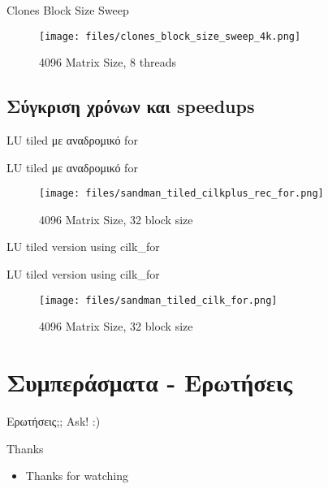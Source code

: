 \documentclass{beamer}
\begin{document}
    \begin{frame}
        \begin{block}{Clones Block Size Sweep}
            \begin{figure}[H]
                \centering
                \texttt{[image: files/clones\_block\_size\_sweep\_4k.png]}
                \caption{4096 Matrix Size, 8 threads}
            \end{figure}
        \end{block}
    \end{frame}

\subsection{Σύγκριση χρόνων και speedups}
\begin{frame}{LU tiled με αναδρομικό for}
    \begin{block}{LU tiled με αναδρομικό for}
        \begin{figure}[H]
            \centering
            \texttt{[image: files/sandman\_tiled\_cilkplus\_rec\_for.png]}
            \caption{4096 Matrix Size, 32 block size}
        \end{figure}
    \end{block}
\end{frame}


\begin{frame}{LU tiled version using cilk\_for}
    \begin{block}{LU tiled version using cilk\_for}
        \begin{figure}[H]
            \centering
            \texttt{[image: files/sandman\_tiled\_cilk\_for.png]}
            \caption{4096 Matrix Size, 32 block size}
        \end{figure}
    \end{block}
\end{frame}

\section{Συμπεράσματα - Ερωτήσεις}

\begin{frame}{Ερωτήσεις;;}
    Ask! :)
\end{frame}

\begin{frame}[fragile]{Thanks}
    \begin{itemize}
        \item Thanks for watching
    \end{itemize}
\end{frame}
\end{document}
